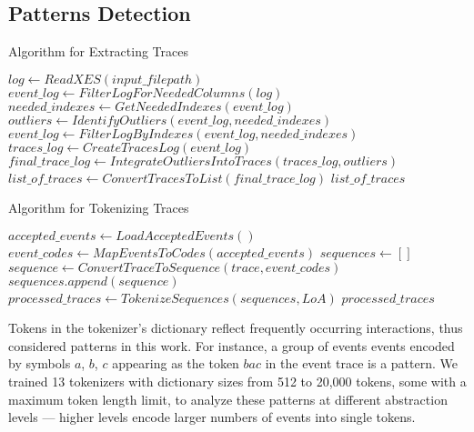 \documentclass[sigplan,nonacm]{acmart}
\begin{document}
\subsection{Patterns Detection}

\begin{algorithm}
\scriptsize
\caption{Algorithm for Extracting Traces}
\label{alg:extract_traces}
\begin{algorithmic}[1]
    \State $log \gets ReadXES(input\_filepath)$
    \State $event\_log \gets FilterLogForNeededColumns(log)$
    \State $needed\_indexes \gets GetNeededIndexes(event\_log)$
    \State $outliers \gets IdentifyOutliers(event\_log, needed\_indexes)$
    \State $event\_log \gets FilterLogByIndexes(event\_log, needed\_indexes)$
    \State $traces\_log \gets CreateTracesLog(event\_log)$
    \State $final\_trace\_log \gets IntegrateOutliersIntoTraces(traces\_log, outliers)$
    \State $list\_of\_traces \gets ConvertTracesToList(final\_trace\_log)$
    \State \Return $list\_of\_traces$
\EndFunction
\end{algorithmic}
\end{algorithm}

\begin{algorithm}
\scriptsize
\caption{Algorithm for Tokenizing Traces}
\label{alg:tokenize_traces}
\begin{algorithmic}[1]
    \State $accepted\_events \gets LoadAcceptedEvents()$
    \State $event\_codes \gets MapEventsToCodes(accepted\_events)$
    \State $sequences \gets []$
        \State $sequence \gets ConvertTraceToSequence(trace, event\_codes)$
        \State $sequences.append(sequence)$
    \EndFor
    \State $processed\_traces \gets TokenizeSequences(sequences, LoA)$
    \State \Return $processed\_traces$
\EndFunction
\end{algorithmic}
\end{algorithm}

Tokens in the tokenizer's dictionary reflect frequently occurring interactions, thus considered patterns in this work. For instance, a group of events events encoded by symbols $a$, $b$, $c$ appearing as the token $bac$ in the event trace is a pattern. We trained 13 tokenizers with dictionary sizes from 512 to 20,000 tokens, some with a maximum token length limit, to analyze these patterns at different abstraction levels — higher levels encode larger numbers of events into single tokens.
\end{document}
